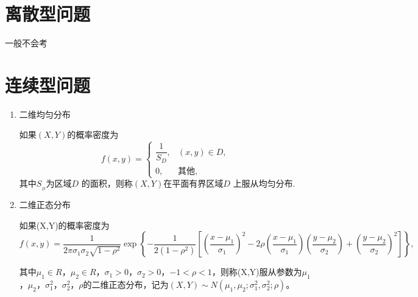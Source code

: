 
\section{离散型问题}
一般不会考

\section{连续型问题}
\begin{enumerate}
      \item 二维均匀分布

            如果$(X,Y)$的概率密度为
            $$f(x,y)=\begin{cases}\dfrac{1}{S_D},&(x,y)\in D,\\0,&\text{其他,}\end{cases}$$
            其中$S_{_{D}}$为区域$D$ 的面积，则称$(X,Y)$在平面有界区域$D$ 上服从均匀分布.

      \item 二维正态分布

            如果(X,Y)的概率密度为
            $$f(x,y)=\frac{1}{2\pi\sigma_1\sigma_2\sqrt{1-\rho^2}}\exp\left\{-\frac{1}{2(1-\rho^2)}\left[\left(\frac{x-\mu_1}{\sigma_1}\right)^2-2\rho\left(\frac{x-\mu_1}{\sigma_1}\right)\left(\frac{y-\mu_2}{\sigma_2}\right)+\left(\frac{y-\mu_2}{\sigma_2}\right)^2\right]\right\},$$

            其中$\mu_1\in R$，$\mu_2\in R$，$\sigma_1>0$，$\sigma_2>0$，$-1<\rho<1$，则称(X,Y)服从参数为$\mu_1$，$\mu_2$，$\sigma_1^2$，$\sigma_2^2$，$\rho$的二维正态分布，记为$(X,Y)\sim N(\mu_1,\mu_2;\sigma_1^2,\sigma_2^2;\rho)$。

\end{enumerate}
